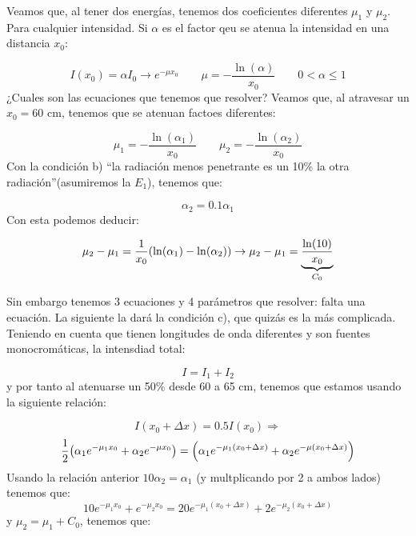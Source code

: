 Veamos que, al tener dos energías, tenemos dos coeficientes diferentes $\mu_1$ y $\mu_2$. Para cualquier intensidad. Si $\alpha$ es el factor qeu se atenua la intensidad en una distancia $x_0$:

\begin{equation}
    I(x_0) = \alpha I_0 \to  e^{-\mu x_0}  \qquad \mu = - \frac{\ln(\alpha)}{x_0}\qquad  0 < \alpha \leq 1
\end{equation}
¿Cuales son las ecuaciones que tenemos que resolver? Veamos que, al atravesar un $x_0=60$ cm, tenemos que se atenuan factoes diferentes: 

\begin{equation}
    \mu_1 = -\frac{\ln (\alpha_1)}{x_0} \qquad 
    \mu_2 = -\frac{\ln (\alpha_2)}{x_0} 
\end{equation}
Con la condición b) ``la radiación menos penetrante es un 10\% la otra radiación''(asumiremos la $E_1$), tenemos que:

\begin{equation}
    \alpha_2 = 0.1 \alpha_1
\end{equation}
Con esta podemos deducir: 

\begin{equation}
    \mu_2 - \mu_1 = \frac{1}{x_0} \pqty{\ln(\alpha_1)-\ln(\alpha_2)} \to \mu_2 - \mu_1 = \underbrace{\frac{\ln(10)}{x_0}}_{C_0}
\end{equation}

Sin embargo tenemos 3 ecuaciones y 4 parámetros que resolver: falta una ecuación. La siguiente la dará la condición c), que quizás es la más complicada. Teniendo en cuenta que tienen longitudes de onda diferentes y son fuentes monocromáticas, la intensdiad total: 

\begin{equation}
    I = I_1 + I_2 
\end{equation}
y por tanto al atenuarse un 50\% desde 60 a 65 cm, tenemos que estamos usando la siguiente relación: 

\begin{equation}
    I(x_0+\Delta x) = 0.5 I(x_0)  \Longrightarrow
\end{equation} 
\begin{equation}
    \frac{1}{2} \pqty{\alpha_1 e^{-\mu_1 x_0} + \alpha_2 e^{-\mu x_0}} = \pqty{\alpha_1 e^{-\mu_1 (x_0+\Delta x)} + \alpha_2 e^{-\mu (x_0+\Delta x)}}
\end{equation}
Usando la relación anterior  $10\alpha_2 = \alpha_1$ (y multplicando por 2 a ambos lados) tenemos que:
\begin{equation} 
    10e^{-\mu_1 x_0} + e^{-\mu_2 x_0} = 20 e^{-\mu_1 (x_0+\Delta x)} +2 e^{-\mu_2 (x_0+\Delta x)}
\end{equation}
y $\mu_2 = \mu_1 + C_0$, tenemos que: 

